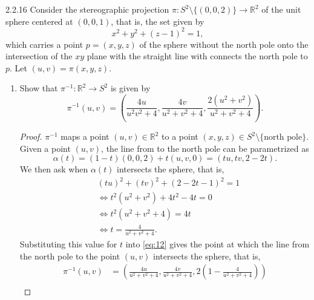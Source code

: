 \documentclass[11pt]{article}
\begin{document}
\begin{problem}{2.2.16}
	Consider the stereographic projection \(\pi: S^2 \setminus \{(0,0,2)\} \rightarrow \mathbb{R}^2\) of the unit sphere centered at \( (0,0,1) \), that is, the set given by
	\begin{equation}
		\label{eq:3}
		x^2 + y^2 + (z-1)^2 = 1,
	\end{equation}
	which carries a point \( p = (x,y,z) \) of the sphere without the north pole onto the intersection of the \( xy \) plane with the straight line with connects the north pole to \( p \).
	Let \( (u,v) = \pi(x,y,z) \).
	\begin{enumerate}[label=(\alph*)]
		\item Show that \( \pi^{-1}: \mathbb{R}^2 \rightarrow S^2 \) is given by
		      \begin{equation}
			      \label{eq:4}
			      \pi^{-1}(u,v) = \left( \frac{4u}{u^2 v^2 + 4}, \frac{4v}{u^2 + v^2 + 4}, \frac{2(u^2 + v^2)}{u^2 + v^2 + 4} \right).
		      \end{equation}
          \begin{proof}
            \(\pi^{-1}\) maps a point \( (u,v) \in \mathbb{R}^2 \) to a point \( (x,y,z) \in S^2 \setminus \{\text{north pole}\} \).
            Given a point \( (u,v) \), the line from to the north pole can be parametrized as
            \begin{equation}
            \label{eq:12}
            \alpha(t) = (1-t)(0,0,2) + t(u, v, 0) = (tu, tv, 2 - 2t).
            \end{equation}
            We then ask when \(\alpha(t)\) intersects the sphere, that is,
            \begin{align}
            \label{eq:13}
              &(tu)^2 + (tv)^2 + (2 - 2t - 1)^2 = 1 \\
              &\Leftrightarrow t^2(u^2 + v^2) + 4t^2 - 4t = 0 \\
              &\Leftrightarrow t^2(u^2 + v^2 + 4) = 4t \\
              &\Leftrightarrow t = \frac{4}{u^2 + v^2 + 4}.
            \end{align}
            Substituting this value for \( t \) into \cref{eq:12} gives the point at which the line from the north pole to the point \( (u,v) \) intersects the sphere, that is,
            \begin{align}
            \label{eq:14}
              \pi^{-1}(u,v) &= \left( \frac{4u}{u^2 + v^2 + 4}, \frac{4v}{u^2 + v^2 + 4}, 2(1 - \frac{4}{u^2 + v^2 + 4} ) \right) \\

\end{align}
\end{proof}
\end{enumerate}
\end{problem}
\end{document}

